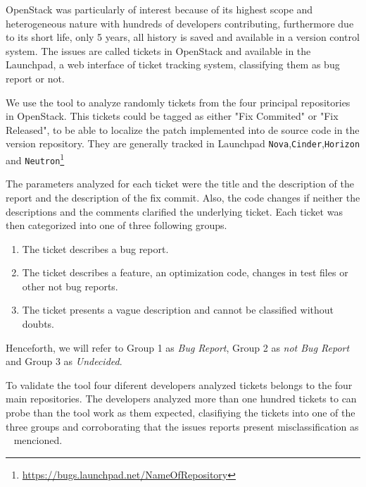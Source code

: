 \documentclass[ifip]{svmult}
\begin{document}
OpenStack was particularly of interest because of its highest scope and heterogeneous nature with hundreds of developers contributing, furthermore due to its short life, only 5 years, all history is saved and available in a version control system. The issues are called tickets in OpenStack and available in the Launchpad, a web interface of ticket tracking system, classifying them as bug report or not.

We use the tool to analyze randomly tickets from the four principal repositories in OpenStack. This tickets could be tagged as either "Fix Commited" or "Fix Released", to be able to localize the patch implemented into de source code in the version repository. They are generally tracked in Launchpad \texttt{Nova},\texttt{Cinder},\texttt{Horizon} and \texttt{Neutron}\footnote{\url{https://bugs.launchpad.net/NameOfRepository}}

The parameters analyzed for each ticket were the title and the description of the report and the description of the fix commit. Also, the code changes if neither the descriptions and the comments clarified the underlying ticket. Each ticket was then categorized into one of three following groups.
\begin{enumerate}
  \item The ticket describes a bug report.
  \item The ticket describes a feature, an optimization code, changes in test files or other not bug reports.
  \item The ticket presents a vague description and cannot be classified without doubts. 
\end{enumerate}

Henceforth, we will refer to Group 1 as \textit{Bug Report}, Group 2 as \textit{not Bug Report} and Group 3 as \textit{Undecided}.

To validate the tool four diferent developers analyzed tickets belongs to the four main repositories. The developers analyzed more than one hundred tickets to can probe than the tool work as them expected, clasifiying the tickets into one of the three groups and corroborating that the issues reports present misclassification as ~\cite{Herzig} mencioned. 

 
\end{document}
